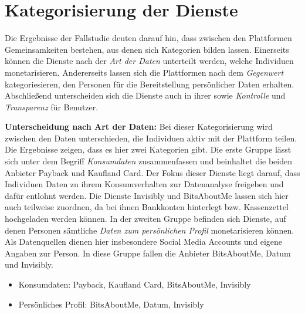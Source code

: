 \section{Kategorisierung der Dienste}
Die Ergebnisse der Fallstudie deuten darauf hin, dass zwischen den Plattformen Gemeinsamkeiten bestehen, aus denen sich Kategorien bilden lassen. Einerseits können die Dienste nach der \textit{Art der Daten} unterteilt werden, welche Individuen monetarisieren. Andererseits lassen sich die Plattformen nach dem \textit{Gegenwert} kategoriesieren, den Personen für die Bereitstellung persönlicher Daten erhalten. Abschließend unterscheiden sich die Dienste auch in ihrer  sowie \textit{Kontrolle} und \textit{Transparenz} für Benutzer. \newline

\noindent \textbf{Unterscheidung nach Art der Daten:} Bei dieser Kategorisierung wird zwischen den Daten unterschieden, die Individuen aktiv mit der Plattform teilen. Die Ergebnisse zeigen, dass es hier zwei Kategorien gibt. Die erste Gruppe lässt sich unter dem Begriff \textit{Konsumdaten} zusammenfassen und beinhaltet die beiden Anbieter Payback und Kaufland Card. Der Fokus dieser Dienste liegt darauf, dass Individuen Daten zu ihrem Konsumverhalten zur Datenanalyse freigeben und dafür entlohnt werden. Die Dienste Invisibly und \linebreak BitsAboutMe lassen sich hier auch teilweise zuordnen, da bei ihnen Bankkonten hinterlegt bzw. Kassenzettel hochgeladen werden können. In der zweiten Gruppe befinden sich Dienste, auf denen Personen sämtliche \textit{Daten zum persönlichen Profil} monetarisieren können. Als Datenquellen dienen hier insbesondere Social Media Accounts und eigene Angaben zur Person. In diese Gruppe fallen die Anbieter BitsAboutMe, Datum und Invisibly.
\begin{itemize}
    \item Konsumdaten: Payback, Kaufland Card, BitsAboutMe, Invisibly
    \item Persönliches Profil: BitsAboutMe, Datum, Invisibly
\end{itemize}

